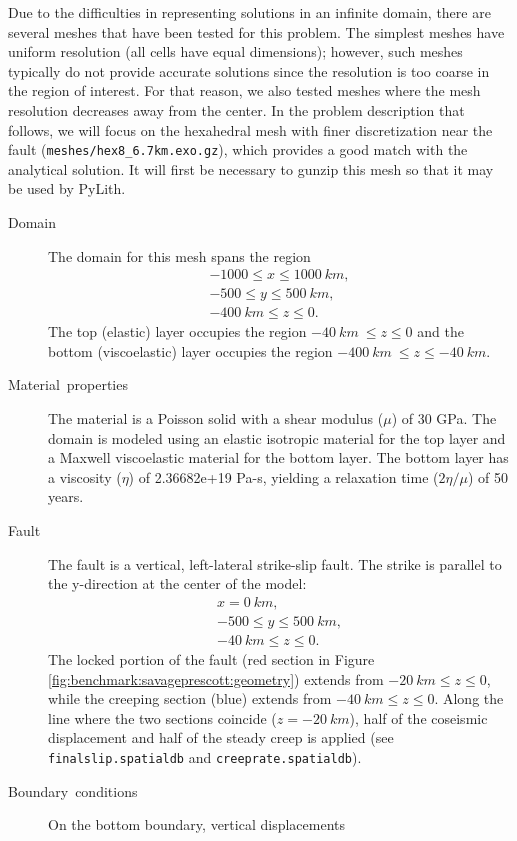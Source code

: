 Due to the difficulties in representing solutions in an infinite domain,
there are several meshes that have been tested for this problem. The
simplest meshes have uniform resolution (all cells have equal dimensions);
however, such meshes typically do not provide accurate solutions since
the resolution is too coarse in the region of interest. For that reason,
we also tested meshes where the mesh resolution decreases away from
the center. In the problem description that follows, we will focus
on the hexahedral mesh with finer discretization near the fault
({\tt meshes/hex8\_6.7km.exo.gz}), which provides a good match
with the analytical solution. It will first be necessary to gunzip
this mesh so that it may be used by PyLith.
\begin{description}
\item [Domain] The domain for this mesh spans the region
\begin{gather*}
-1000\leq x\leq1000\ km,\\
-500\leq y\leq500\ km,\\
-400\ km\leq z\leq0.
\end{gather*}
The top (elastic) layer occupies the region $-40\ km\ \leq z\leq0$
and the bottom (viscoelastic) layer occupies the region $-400\ km\ \leq z\leq-40\ km$.
\item [Material~properties] The material is a Poisson solid with a shear
modulus ($\mu$) of 30 GPa. The domain is modeled using an elastic
isotropic material for the top layer and a Maxwell viscoelastic material
for the bottom layer. The bottom layer has a viscosity ($\eta$) of
2.36682e+19 Pa-s, yielding a relaxation time ($2\eta/\mu$) of 50
years.
\item [Fault] The fault is a vertical, left-lateral strike-slip fault.
The strike is parallel to the y-direction at the center of the model:
\begin{gather*}
x=0\ km,\\
-500\leq y\leq500\ km,\\
-40\ km\leq z\leq0.
\end{gather*}
The locked portion of the fault (red section in Figure \ref{fig:benchmark:savageprescott:geometry})
extends from $-20\: km\leq z\leq0$, while the creeping section (blue)
extends from $-40\: km\leq z\leq0$. Along the line where the two
sections coincide ($z=-20\: km$), half of the coseismic displacement
and half of the steady creep is applied (see \texttt{finalslip.spatialdb}
and \texttt{creeprate.spatialdb}).
\item [Boundary~conditions] On the bottom boundary, vertical displacements

\end{description}
